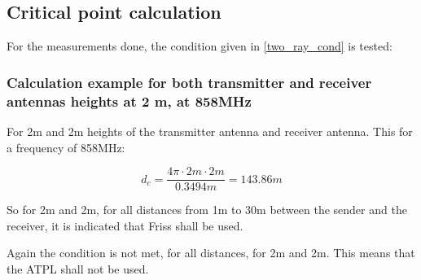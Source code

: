 \subsection{Critical point calculation}
For the measurements done, the condition given in \eqref{two_ray_cond} is tested:


\subsubsection{Calculation example for both transmitter and receiver antennas heights at 2 m, at 858MHz}

For 2m and 2m heights of the transmitter antenna and receiver antenna. This for a frequency of 858MHz:

\begin{equation}
d_{c} = \frac{4\pi \cdot 2m \cdot 2m}{0.3494m} = 143.86m
\label{critical_fac_dc_calc_2_2_858MHz}
\end{equation}

So for 2m and 2m, for all distances from 1m to 30m between the sender and the receiver, it is indicated that Friss shall be used. 


Again the condition is not met, for all distances, for 2m and 2m. This means that the ATPL shall not be used.








